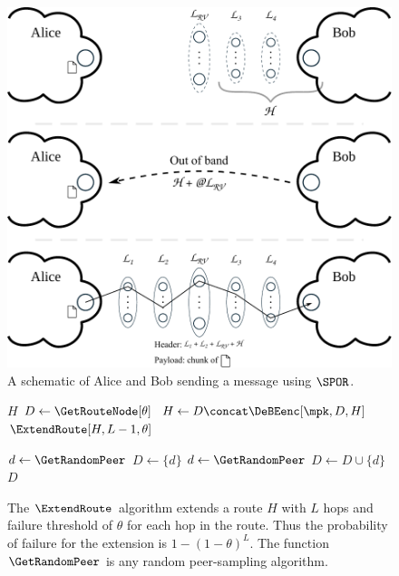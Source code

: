 \begin{figure}
  \includegraphics[width=\linewidth]{figures/file_exchange.pdf}
  \caption{\label{fig:file-exchange}%
    A schematic of Alice and Bob sending a message using \(\SPOR\).
  }
\end{figure}


\begin{figure}
  \begin{algorithmic}
        \State \Return $H$
      \EndIf
      \State $D\gets \GetRouteNode[\theta]$
      \State $H\gets D\concat \DeBEenc[\mpk, D, H]$
      \State \Return $\ExtendRoute[H, L-1, \theta]$
    \EndFunction

    \Function{\GetRouteNode}{$\theta$}
      \State $d\gets \GetRandomPeer$
      \State $D\gets \{d\}$
        \State $d\gets \GetRandomPeer$
        \State $D\gets D\cup \{d\}$
      \EndWhile
      \State \Return $D$
    \EndFunction
  \end{algorithmic}
  \caption{\label{ExtendRoute}%
    The \(\ExtendRoute\) algorithm extends a route \(H\) with \(L\) hops and 
    failure threshold of \(\theta\) for each hop in the route.
    Thus the probability of failure for the extension is \(1 - (1 - \theta)^L\).
    The function \(\GetRandomPeer\) is any random peer-sampling algorithm.
  }
\end{figure}

